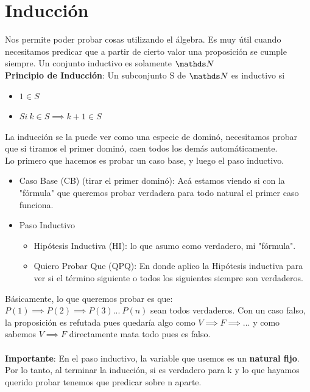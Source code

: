 \documentclass[10pt,a4paper]{article}
\begin{document}
\section*{Inducción}
Nos permite poder probar cosas utilizando el álgebra. Es muy útil cuando necesitamos predicar que a partir de cierto valor una proposición se cumple siempre. Un conjunto inductivo es solamente $\nat$ \\
\textbf{Principio de Inducción}: Un subconjunto S de $\nat$ es inductivo si 
\begin{itemize}
    \item $1 \in S$
    \item $Si \ k \in S \implies k+1 \in S$
\end{itemize}
La inducción se la puede ver como una especie de dominó, necesitamos probar que si tiramos el primer dominó, caen todos los demás automáticamente. \\
Lo primero que hacemos es probar un caso base, y luego el paso inductivo. 
\begin{itemize}
    \item Caso Base (CB) (tirar el primer dominó): Acá estamos viendo si con la "fórmula" que queremos probar verdadera para todo natural el primer caso funciona.
    \item Paso Inductivo
    \begin{itemize}
        \item Hipótesis Inductiva (HI): lo que asumo como verdadero, mi "fórmula".
        \item Quiero Probar Que (QPQ): En donde aplico la Hipótesis inductiva para ver si el término siguiente o todos los siguientes siempre son verdaderos.
    \end{itemize}
\end{itemize}
Básicamente, lo que queremos probar es que: $P(1) \implies P(2) \implies P(3) ... \ P(n)$ sean todos verdaderos. Con un caso falso, la proposición es refutada pues quedaría algo como $V \implies F \implies ...$ y como sabemos $V \implies F$ directamente mata todo pues es falso. \\ \\
\textbf{Importante}: En el paso inductivo, la variable que usemos es un \textbf{natural fijo}. Por lo tanto, al terminar la inducción, si es verdadero para k y lo que hayamos querido probar tenemos que predicar sobre n aparte.
\end{document}
